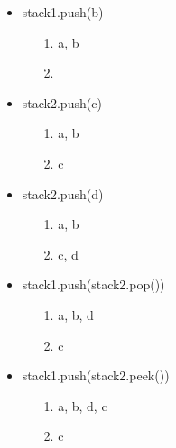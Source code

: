 \documentclass[10pt]{article}
\begin{document}
\begin{enumerate}
\begin{itemize}
				\item stack1.push(b)
					
					\begin{enumerate}
						
						\item[1.] a, b
						
						\item[2.]
					
					\end{enumerate}
				
				\item stack2.push(c)
					
					\begin{enumerate}
						
						\item[1.] a, b
						
						\item[2.] c
					
					\end{enumerate}
				
				\item stack2.push(d)
				
					\begin{enumerate}
						
						\item[1.] a, b
						
						\item[2.] c, d
					
					\end{enumerate}
				
				\item stack1.push(stack2.pop())
					
					\begin{enumerate}
						
						\item[1.] a, b, d
						
						\item[2.] c
					
					\end{enumerate}
				
				\item stack1.push(stack2.peek())
					
					\begin{enumerate}
						
						\item[1.] a, b, d, c
						
						\item[2.] c
					

\end{enumerate}
\end{itemize}
\end{enumerate}
\end{document}

